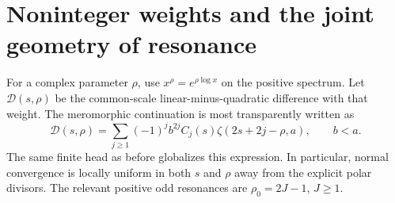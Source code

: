 \section{Noninteger weights and the joint geometry of resonance}
\label{hqj:sec:rho}

For a complex parameter $\rho$, use $x^\rho=e^{\rho\log x}$ on the
positive spectrum. Let $\mathcal D(s,\rho)$ be the common-scale
linear-minus-quadratic difference with that weight. The meromorphic
continuation is most transparently written as
\begin{equation}\label{hqj:eq:rho-master}
\mathcal D(s,\rho)=\sum_{j\ge1}(-1)^jb^{2j}
C_j(s)\zeta(2s+2j-\rho,a),\qquad b<a.
\end{equation}
The same finite head as before globalizes this expression. In
particular, normal convergence is locally uniform in both $s$ and
$\rho$ away from the explicit polar divisors. The relevant positive
odd resonances are $\rho_0=2J-1$, $J\ge1$.

